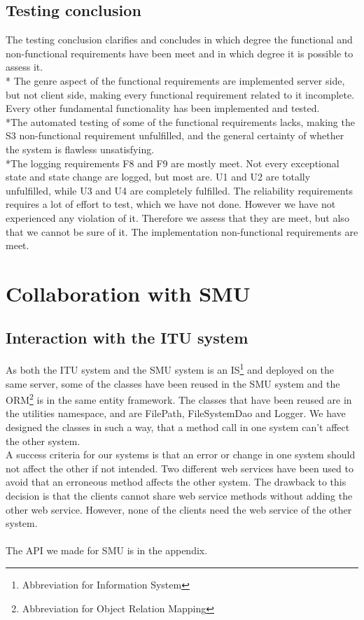 \documentclass[a4paper,11pt,report]{article}
\begin{document}
{\subsection{Testing conclusion}
The testing conclusion clarifies and concludes in which degree the functional and non-functional requirements have been meet and in which degree it is possible to assess it. \\*
The genre aspect of the functional requirements are implemented server side, but not client side, making every functional requirement related to it incomplete. Every other fundamental functionality has been implemented and tested. \\*The automated testing of some of the functional requirements lacks, making the S3 non-functional requirement unfulfilled, and the general certainty of whether the system is flawless unsatisfying.\\*The logging requirements F8 and F9 are mostly meet. Not every exceptional state and state change are logged, but most are. U1 and U2 are totally unfulfilled, while U3 and U4 are completely fulfilled. The reliability requirements requires a lot of effort to test, which we have not done. However we have not experienced any violation of it. Therefore we assess that they are meet, but also that we cannot be sure of it. The implementation non-functional requirements are meet.

\section{Collaboration with SMU}

\subsection{Interaction with the ITU system}
As both the ITU system and the SMU system is an IS\footnote[2]{Abbreviation for Information System} and deployed on the same server, some of the classes have been reused in the SMU system and the ORM\footnote[3]{Abbreviation for Object Relation Mapping} is in the same entity framework.
The classes that have been reused are in the utilities namespace, and are FilePath, FileSystemDao and Logger. We have designed the classes in such a way, that a method call in one system can't affect the other system. \\
A success criteria for our systems is that an error or change in one system should not affect the other if not intended. Two different web services have been used to avoid that an erroneous method affects the other system.
The drawback to this decision is that the clients cannot share web service methods without adding the other web service. However, none of the clients need the web service of the other system. \\ \\
The API we made for SMU is in the appendix.

}
\end{document}
